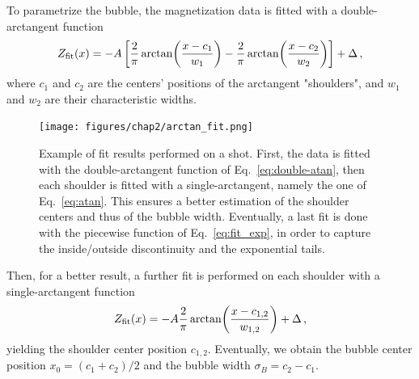 To parametrize the bubble, the magnetization data is fitted with a double-arctangent function
\begin{equation}
    Z_{\rm fit}(x) = -A \left[\frac{2}{\pi}\arctan(\frac{x-c_1}{w_1}) - \frac{2}{\pi}\arctan(\frac{x-c_2}{w_2})\right] + \Delta\, ,
    \label{eq:double-atan}
\end{equation}
where $c_1$ and $c_2$ are the centers' positions of the arctangent "shoulders", and $w_1$ and $w_2$ are their characteristic widths. 
\begin{figure}[h!]
    \centering
    \texttt{[image: figures/chap2/arctan\_fit.png]}
    \caption{Example of fit results performed on a shot. First, the data is fitted with the double-arctangent function of Eq.\ \eqref{eq:double-atan}, then each shoulder is fitted with a single-arctangent, namely the one of Eq.\ \eqref{eq:atan}. This ensures a better estimation of the shoulder centers and thus of the bubble width. Eventually, a last fit is done with the piecewise function of Eq.\ \eqref{eq:fit_exp}, in order to capture the inside/outside discontinuity and the exponential tails.}
    \label{fig:atan-fit}
\end{figure}
Then, for a better result, a further fit is performed on each shoulder with a single-arctangent function
\begin{equation}
    Z_{\rm fit}(x) = -A \frac{2}{\pi}\arctan(\frac{x-c_{1,2}}{w_{1,2}}) + \Delta\, ,
    \label{eq:atan}
\end{equation}
yielding the shoulder center position $c_{1,2}$. Eventually, we obtain the bubble center position $x_0 = (c_1 + c_2)/2$ and the bubble width $\sigma_B = c_2 - c_1$.

